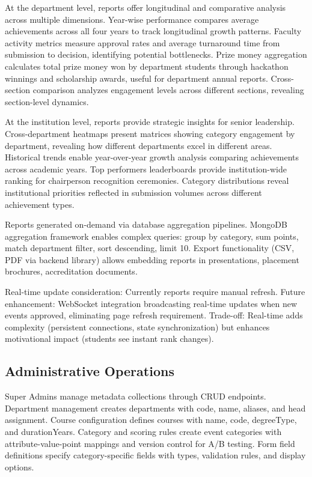 \documentclass[12pt]{article}
\begin{document}
At the department level, reports offer longitudinal and comparative analysis across multiple dimensions. Year-wise performance compares average achievements across all four years to track longitudinal growth patterns. Faculty activity metrics measure approval rates and average turnaround time from submission to decision, identifying potential bottlenecks. Prize money aggregation calculates total prize money won by department students through hackathon winnings and scholarship awards, useful for department annual reports. Cross-section comparison analyzes engagement levels across different sections, revealing section-level dynamics.

At the institution level, reports provide strategic insights for senior leadership. Cross-department heatmaps present matrices showing category engagement by department, revealing how different departments excel in different areas. Historical trends enable year-over-year growth analysis comparing achievements across academic years. Top performers leaderboards provide institution-wide ranking for chairperson recognition ceremonies. Category distributions reveal institutional priorities reflected in submission volumes across different achievement types.

Reports generated on-demand via database aggregation pipelines. MongoDB aggregation framework enables complex queries: group by category, sum points, match department filter, sort descending, limit 10. Export functionality (CSV, PDF via backend library) allows embedding reports in presentations, placement brochures, accreditation documents.

Real-time update consideration: Currently reports require manual refresh. Future enhancement: WebSocket integration broadcasting real-time updates when new events approved, eliminating page refresh requirement. Trade-off: Real-time adds complexity (persistent connections, state synchronization) but enhances motivational impact (students see instant rank changes).

\subsection{Administrative Operations}
Super Admins manage metadata collections through CRUD endpoints. Department management creates departments with code, name, aliases, and head assignment. Course configuration defines courses with name, code, degreeType, and durationYears. Category and scoring rules create event categories with attribute-value-point mappings and version control for A/B testing. Form field definitions specify category-specific fields with types, validation rules, and display options.
\end{document}
